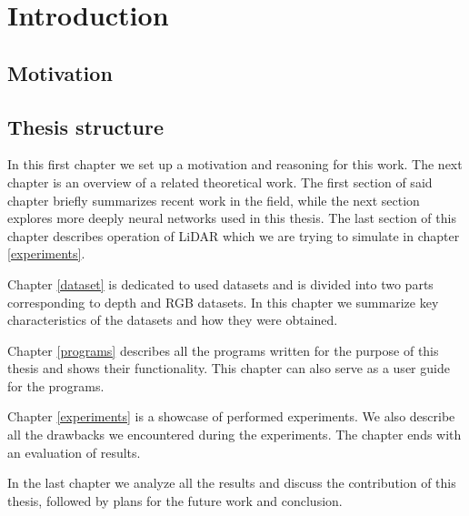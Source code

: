 \chapter{Introduction}

\section{Motivation}

\section{Thesis structure}
In this first chapter we set up a motivation and reasoning for this work. The next chapter is an overview of a related theoretical work. The first section of said chapter briefly summarizes recent work in the field, while the next section explores more deeply neural networks used in this thesis. The last section of this chapter describes operation of LiDAR which we are trying to simulate in chapter \ref{experiments}.

Chapter \ref{dataset} is dedicated to used datasets and is divided into two parts corresponding to depth and RGB datasets. In this chapter we summarize key characteristics of the datasets and how they were obtained.

Chapter \ref{programs} describes all the programs written for the purpose of this thesis and shows their functionality. This chapter can also serve as a user guide for the programs.

Chapter \ref{experiments} is a showcase of performed experiments. We also describe all the drawbacks we encountered during the experiments. The chapter ends with an evaluation of results.

In the last chapter we analyze all the results and discuss the contribution of this thesis, followed by plans for the future work and conclusion.
